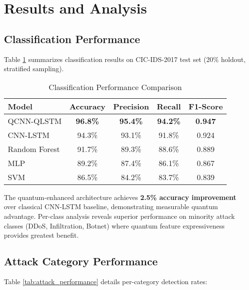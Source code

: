 \documentclass[conference]{IEEEtran}
\begin{document}
\section{Results and Analysis}

\subsection{Classification Performance}

Table \ref{tab:performance} summarizes classification results on CIC-IDS-2017 test set (20\% holdout, stratified sampling).

\begin{table}[htbp]
\caption{Classification Performance Comparison}
\begin{center}
\begin{tabular}{lcccc}
\toprule
\textbf{Model} & \textbf{Accuracy} & \textbf{Precision} & \textbf{Recall} & \textbf{F1-Score} \\
\midrule
QCNN-QLSTM & \textbf{96.8\%} & \textbf{95.4\%} & \textbf{94.2\%} & \textbf{0.947} \\
CNN-LSTM & 94.3\% & 93.1\% & 91.8\% & 0.924 \\
Random Forest & 91.7\% & 89.3\% & 88.6\% & 0.889 \\
MLP & 89.2\% & 87.4\% & 86.1\% & 0.867 \\
SVM & 86.5\% & 84.2\% & 83.7\% & 0.839 \\
\bottomrule
\end{tabular}
\label{tab:performance}
\end{center}
\end{table}

The quantum-enhanced architecture achieves \textbf{2.5\% accuracy improvement} over classical CNN-LSTM baseline, demonstrating measurable quantum advantage. Per-class analysis reveals superior performance on minority attack classes (DDoS, Infiltration, Botnet) where quantum feature expressiveness provides greatest benefit.

\subsection{Attack Category Performance}

Table \ref{tab:attack_performance} details per-category detection rates:
\end{document}
